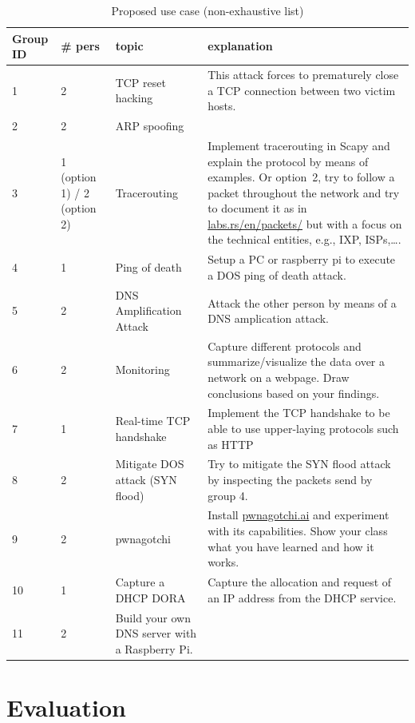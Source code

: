 \documentclass[11pt,a4paper]{article}
\begin{document}
\begin{table}[h!]
\centering
\renewcommand{\arraystretch}{1.3}
\caption{Proposed use case (non-exhaustive list)}%
\label{tab:use-cases}
\footnotesize
\begin{tabular}{@{}p{1cm} p{2cm} p{4cm} p{8cm}@{}}
\toprule
Group ID &\# pers & topic & explanation \\ \midrule
1&2       & TCP reset hacking     &  This attack forces to prematurely close a TCP connection between two victim hosts. \\
2&2       & ARP spoofing       \\
3&1 (option 1) / 2 (option 2)       & Tracerouting     & Implement tracerouting in Scapy and explain the protocol by means of examples. Or option~2, try to follow a packet throughout the network and try to document it as in \url{labs.rs/en/packets/} but with a focus on the technical entities, e.g., IXP, ISPs,\ldots.  \\ 
4&1 & Ping of death & Setup a PC or raspberry pi to execute a DOS ping of death attack.\\
5&2 & DNS Amplification Attack & Attack the other person by means of a DNS amplication attack. \\
6&2 & Monitoring & Capture different protocols and summarize/visualize the data over a network on a webpage. Draw conclusions based on your findings. \\
7&1 & Real-time TCP handshake & Implement the TCP handshake to be able to use upper-laying protocols such as HTTP \\
8&2 & Mitigate DOS attack (SYN flood) & Try to mitigate the SYN flood attack by inspecting the packets send by group 4.  \\
9 & 2 &pwnagotchi & Install \url{pwnagotchi.ai} and experiment with its capabilities. Show your class what you have learned and how it works.  \\
10&1& Capture a DHCP DORA & Capture the allocation and request of an IP address from the DHCP service.  \\
11&2& Build your own DNS server with a Raspberry Pi.  \\
\bottomrule
\end{tabular}%
\end{table}

\FloatBarrier
\section{Evaluation}
\end{document}
